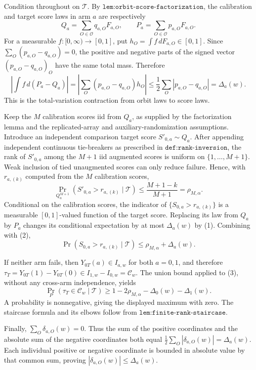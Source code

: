 Condition throughout on \(\mathcal T\). By \(\texttt{lem:orbit-score-factorization}\), the calibration and target score laws in arm \(a\) are respectively \[Q_a=\sum_{O\in\mathcal O}q_{a,O}F_{a,O},\qquad P_a=\sum_{O\in\mathcal O}p_{a,O}F_{a,O}.\] For a measurable \(f:[0,\infty)\to[0,1]\), put \(h_O=\int f\,dF_{a,O}\in[0,1]\). Since \(\sum_O(p_{a,O}-q_{a,O})=0\), the positive and negative parts of the signed vector \((p_{a,O}-q_{a,O})_O\) have the same total mass. Therefore \[\left|\int f\,d(P_a-Q_a)\right|=\left|\sum_O(p_{a,O}-q_{a,O})h_O\right|\le\frac12\sum_O|p_{a,O}-q_{a,O}|=\Delta_a(w).\tag{1}\] This is the total-variation contraction from orbit laws to score laws.

Keep the \(M\) calibration scores iid from \(Q_a\), as supplied by the factorization lemma and the replicated-array and auxiliary-randomization assumptions. Introduce an independent comparison target score \(S'_{0,a}\sim Q_a\). After appending independent continuous tie-breakers as prescribed in \(\texttt{def:rank-inversion}\), the rank of \(S'_{0,a}\) among the \(M+1\) iid augmented scores is uniform on \(\{1,\ldots,M+1\}\). Weak inclusion of tied unaugmented scores can only reduce failure. Hence, with \(r_{a,(k)}\) computed from the \(M\) calibration scores, \[\Pr_{Q_a^{M+1}}(S'_{0,a}>r_{a,(k)}\mid\mathcal T)\le\frac{M+1-k}{M+1}=\rho_{M,\alpha}.\tag{2}\] Conditional on the calibration scores, the indicator of \(\{S_{0,a}>r_{a,(k)}\}\) is a measurable \([0,1]\)-valued function of the target score. Replacing its law from \(Q_a\) by \(P_a\) changes its conditional expectation by at most \(\Delta_a(w)\) by (1). Combining with (2), \[\Pr(S_{0,a}>r_{a,(k)}\mid\mathcal T)\le\rho_{M,\alpha}+\Delta_a(w).\tag{3}\]

If neither arm fails, then \(Y_{0T}(a)\in I_{a,w}\) for both \(a=0,1\), and therefore \(\tau_T=Y_{0T}(1)-Y_{0T}(0)\in I_{1,w}-I_{0,w}=\mathcal C_w\). The union bound applied to (3), without any cross-arm independence, yields \[\Pr_P(\tau_T\in\mathcal C_w\mid\mathcal T)\ge1-2\rho_{M,\alpha}-\Delta_0(w)-\Delta_1(w).\] A probability is nonnegative, giving the displayed maximum with zero. The staircase formula and its elbows follow from \(\texttt{lem:finite-rank-staircase}\).

Finally, \(\sum_O\delta_{a,O}(w)=0\). Thus the sum of the positive coordinates and the absolute sum of the negative coordinates both equal \(\tfrac12\sum_O|\delta_{a,O}(w)|=\Delta_a(w)\). Each individual positive or negative coordinate is bounded in absolute value by that common sum, proving \(|\delta_{a,O}(w)|\le\Delta_a(w)\).